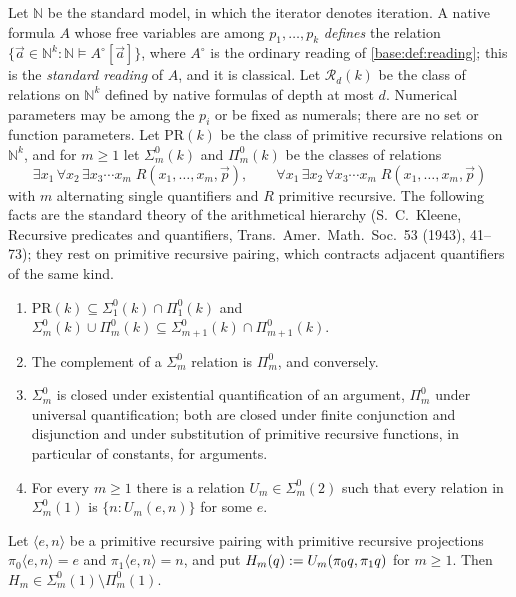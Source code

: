 Let $\mathbb N$ be the standard model, in which the iterator denotes
iteration.  A native formula $A$ whose free variables are among
$p_1,\dots,p_k$ \emph{defines} the relation
$\{\vec a\in\mathbb N^k:\mathbb N\models A^\circ[\vec a]\}$, where $A^\circ$
is the ordinary reading of \cref{base:def:reading}; this is the
\emph{standard reading} of $A$, and it is classical.  Let $\mathcal R_d(k)$
be the class of relations on $\mathbb N^k$ defined by native formulas of
depth at most $d$.  Numerical parameters may be among the $p_i$ or be fixed
as numerals; there are no set or function parameters.  Let $\mathrm{PR}(k)$
be the class of primitive recursive relations on $\mathbb N^k$, and for
$m\ge1$ let $\Sigma^0_m(k)$ and $\Pi^0_m(k)$ be the classes of relations
\[
 \exists x_1\,\forall x_2\,\exists x_3\cdots x_m\;
 R(x_1,\dots,x_m,\vec p),\qquad
 \forall x_1\,\exists x_2\,\forall x_3\cdots x_m\;
 R(x_1,\dots,x_m,\vec p)
\]
with $m$ alternating single quantifiers and $R$ primitive recursive.  The
following facts are the standard theory of the arithmetical hierarchy
(S.~C.~Kleene, Recursive predicates and quantifiers, Trans.\ Amer.\ Math.\
Soc.\ 53 (1943), 41--73); they rest on primitive recursive pairing, which
contracts adjacent quantifiers of the same kind.
\begin{enumerate}[label=\textup{(H\arabic*)}]
\item $\mathrm{PR}(k)\subseteq\Sigma^0_1(k)\cap\Pi^0_1(k)$ and
 $\Sigma^0_m(k)\cup\Pi^0_m(k)\subseteq\Sigma^0_{m+1}(k)\cap\Pi^0_{m+1}(k)$.
\item The complement of a $\Sigma^0_m$ relation is $\Pi^0_m$, and
 conversely.
\item $\Sigma^0_m$ is closed under existential quantification of an
 argument, $\Pi^0_m$ under universal quantification; both are closed under
 finite conjunction and disjunction and under substitution of primitive
 recursive functions, in particular of constants, for arguments.
\item For every $m\ge1$ there is a relation $U_m\in\Sigma^0_m(2)$ such that
 every relation in $\Sigma^0_m(1)$ is $\{n:U_m(e,n)\}$ for some $e$.
\end{enumerate}

\begin{lemma}
\label{kern:lem:hier}
Let $\langle e,n\rangle$ be a primitive recursive pairing with primitive
recursive projections $\pi_0\langle e,n\rangle=e$ and
$\pi_1\langle e,n\rangle=n$, and put $H_m(q)\mathrel{:=} U_m(\pi_0q,\pi_1q)$ for
$m\ge1$.  Then $H_m\in\Sigma^0_m(1)\setminus\Pi^0_m(1)$.
\end{lemma}

